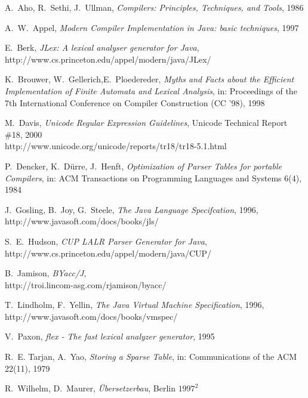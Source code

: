 \documentclass[11pt]{scrartcl}
\newcommand{\trit}{\em}
\begin{document}
\newpage  
\begin{thebibliography}{[00]} 
\label{References} 

  A.~Aho, R.~Sethi, J.~Ullman, {\trit Compilers: Principles, Techniques, and Tools}, 1986


  A.~W.~Appel, {\trit Modern Compiler Implementation in Java: basic techniques}, 1997

 E.~Berk, {\trit JLex: A lexical analyser generator for Java},\\
                   {http://www.cs.princeton.edu/appel/modern/java/JLex/}


  K.~Brouwer, W.~Gellerich,E.~Ploedereder, 
  {\trit Myths and Facts about the Efficient Implementation of Finite Automata and Lexical Analysis}, 
  in: Proceedings of the 7th International Conference on Compiler Construction (CC '98), 1998

  M.~Davis, {\trit Unicode Regular Expression Guidelines}, Unicode Technical Report \#18, 2000\\ 
                    {http://www.unicode.org/unicode/reports/tr18/tr18-5.1.html}

 P.~Dencker, K.~D{\"u}rre, J.~Henft, {\trit Optimization of Parser Tables for portable Compilers}, 
 in: ACM Transactions on Programming Languages and Systems 6(4), 1984

  J.~Gosling, B.~Joy, G.~Steele, {\trit The Java Language Specifcation}, 1996,\\
                    {http://www.javasoft.com/docs/books/jls/}

  S.~E.~Hudson, {\trit CUP LALR Parser Generator for Java},\\  
  {http://www.cs.princeton.edu/appel/modern/java/CUP/}

  B.~Jamison, {\trit BYacc/J},\\
  {http://troi.lincom-asg.com/rjamison/byacc/}
  
 T.~Lindholm, F.~Yellin, {\trit The Java Virtual Machine Specification}, 1996,\\
                   {http://www.javasoft.com/docs/books/vmspec/}
 
 V.~Paxon, {\trit flex - The fast lexical analyzer generator}, 1995

  R.~E. Tarjan, A.~Yao, {\trit Storing a Sparse Table}, in: Communications of the ACM 22(11), 1979 

  R.~Wilhelm, D.~Maurer, {\trit {\"U}bersetzerbau}, Berlin $1997^2$

\end{thebibliography}
\end{document}
